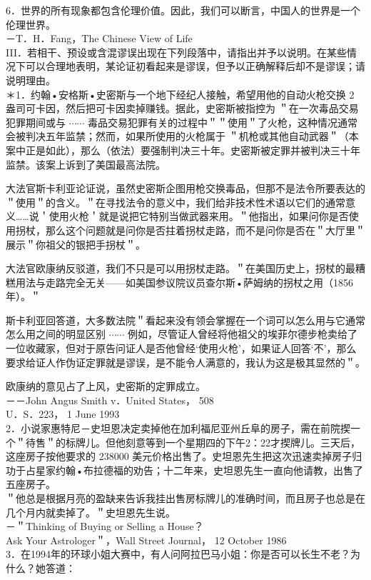 6．世界的所有现象都包含伦理价值。因此，我们可以断言，中国人的世界是一个伦理世界。\\
－T．H．Fang，The Chinese View of Life\\
III．若相干、预设或含混谬误出现在下列段落中，请指出并予以说明。在某些情况下可以合理地表明，某论证初看起来是谬误，但予以正确解释后却不是谬误；请说明理由。\\
＊1．约翰•安格斯•史密斯与一个地下经纪人接触，希望用他的自动火枪交换 2 盎司可卡因，然后把可卡因卖掉赚钱。据此，史密斯被指控为 ＂在一次毒品交易犯罪期间或与 $\cdots \cdots$ 毒品交易犯罪有关的过程中＂＂使用＂了火枪，这种情况通常会被判决五年监禁；然而，如果所使用的火枪属于 ＂机枪或其他自动武器＂（本案中正是如此），那么（依法）要强制判决三十年。史密斯被定罪并被判决三十年监禁。该案上诉到了美国最高法院。

大法官斯卡利亚论证说，虽然史密斯企图用枪交换毒品，但那不是法令所要表达的＂使用＂的含义。＂在寻找法令的意义中，我们给非技术性术语以它们的通常意义……说＇使用火枪＇就是说把它特别当做武器来用。＂他指出，如果问你是否使用拐杖，那么这个问题就是问你是否拄着拐杖走路，而不是问你是否在＂大厅里＂展示＂你祖父的银把手拐杖＂。

大法官欧康纳反驳道，我们不只是可以用拐杖走路。＂在美国历史上，拐杖的最糟糕用法与走路完全无关——如美国参议院议员查尔斯•萨姆纳的拐杖之用（1856年）。＂

斯卡利亚回答道，大多数法院＂看起来没有领会掌握在一个词可以怎么用与它通常怎么用之间的明显区别 $\cdots \cdots$ 例如，尽管证人曾经将他祖父的埃菲尔德步枪卖给了一位收藏家，但对于原告问证人是否他曾经‘使用火枪’，如果证人回答‘不’，那么要求给证人作伪证定罪就是谬误，是不能令人满意的，我认为这是极其显然的＂。

欧康纳的意见占了上风，史密斯的定罪成立。\\
－－John Angus Smith v．United States， 508\\
U．S．223， 1 June 1993\\
2．小说家惠特尼－史坦恩决定卖掉他在加利福尼亚州丘阜的房子，需在前院揳一个＂待售＂的标牌儿。但他刻意等到一个星期四的下午2：22才揳牌儿。三天后，这座房子按他要求的 238000 美元价格出售了。史坦恩先生把这次迅速卖掉房子归功于占星家约翰•布拉德福的劝告；十二年来，史坦恩先生一直向他请教，出售了五座房子。\\
＂他总是根据月亮的盈缺来告诉我挂出售房标牌儿的准确时间，而且房子也总是在几个月内就卖掉了。＂史坦恩先生说。\\
－＂Thinking of Buying or Selling a House？\\
Ask Your Astrologer＂，Wall Street Journal， 12 October 1986\\
3．在1994年的环球小姐大赛中，有人问阿拉巴马小姐：你是否可以长生不老？为什么？她答道：


